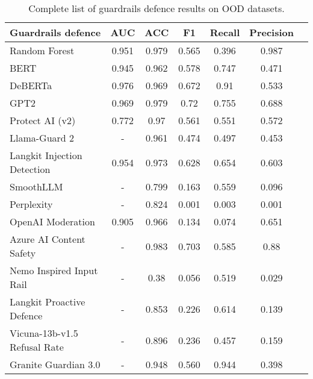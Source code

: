 \begin{table}[t]\centering
\scriptsize
\begin{tabular}{lcccccc}\toprule
Guardrails defence &AUC &ACC &F1 &Recall &Precision \\ \midrule
Random Forest & 0.951 & 0.979 & 0.565 & 0.396 & 0.987\\
\rowcolor{gray!7} BERT & 0.945 & 0.962 & 0.578 & 0.747 & 0.471\\
DeBERTa & 0.976 & 0.969 & 0.672 & 0.91 & 0.533\\
\rowcolor{gray!7} GPT2 & 0.969 & 0.979 & 0.72 & 0.755 & 0.688\\
Protect AI (v2) & 0.772 & 0.97 & 0.561 & 0.551 & 0.572\\
\rowcolor{gray!7} Llama-Guard 2 & -  & 0.961 & 0.474 & 0.497 & 0.453\\
Langkit Injection Detection & 0.954 & 0.973 & 0.628 & 0.654 & 0.603\\
\rowcolor{gray!7} SmoothLLM & -  & 0.799 & 0.163 & 0.559 & 0.096\\
Perplexity & -  & 0.824 & 0.001 & 0.003 & 0.001\\
\rowcolor{gray!7} OpenAI Moderation & 0.905 & 0.966 & 0.134 & 0.074 & 0.651\\
Azure AI Content Safety & -  & 0.983 & 0.703 & 0.585 & 0.88\\
\rowcolor{gray!7} Nemo Inspired Input Rail & -  & 0.38 & 0.056 & 0.519 & 0.029\\
Langkit Proactive Defence & -  & 0.853 & 0.226 & 0.614 & 0.139\\
\rowcolor{gray!7} Vicuna-13b-v1.5 Refusal Rate & -  & 0.896 & 0.236 & 0.457 & 0.159\\
Granite Guardian 3.0 & -  & 0.948 & 0.560 & 0.944 & 0.398\\
\bottomrule\end{tabular}\caption{Complete list of guardrails defence results on OOD datasets.}
\label{tab:ood_aggregate_results}
\end{table}